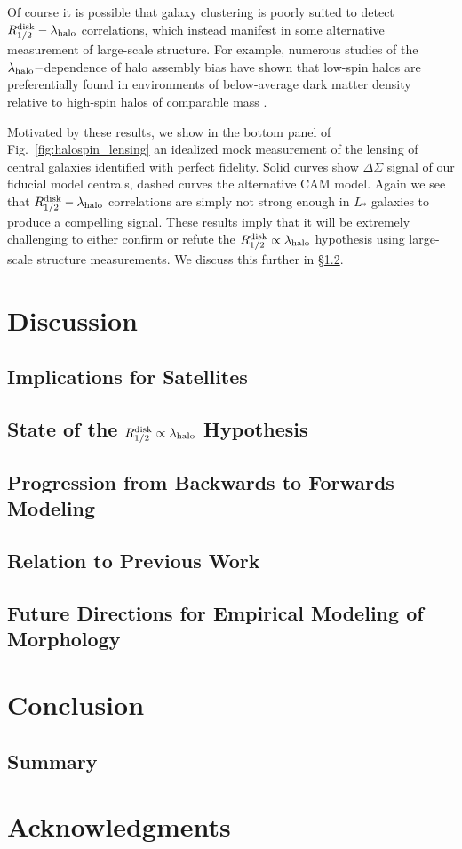 \documentclass[usenatbib,usegraphicx,letterpaper]{mn2e}
\newcommand{\rhalfdisk}{R_{1/2}^{\rm disk}}
\newcommand{\halospin}{\lambda_{\rm halo}}
\begin{document}
Of course it is possible that galaxy clustering is poorly suited to detect $\rhalfdisk-\halospin$ correlations, which instead manifest in some alternative measurement of large-scale structure. For example, numerous studies of the $\halospin-$dependence of halo assembly bias have shown that low-spin halos are preferentially found in environments of below-average dark matter density relative to high-spin halos of comparable mass \citep[see, for example,][]{lee_etal17}.

Motivated by these results, we show in the bottom panel of Fig.~\ref{fig:halospin_lensing} an idealized mock measurement of the lensing of central galaxies identified with perfect fidelity. Solid curves show $\Delta\Sigma$ signal of our fiducial model centrals, dashed curves the alternative CAM model. Again we see that $\rhalfdisk-\halospin$ correlations are simply not strong enough in $L_\ast$ galaxies to produce a compelling signal. These results imply that it will be extremely challenging to either confirm or refute the $\rhalfdisk\propto\halospin$ hypothesis using large-scale structure measurements. We discuss this further in \S\ref{subsec:mo_status}.


\section{Discussion}
\label{sec:discussion}


\subsection{Implications for Satellites}
\label{subsec:satellite_discussion}

\subsection{State of the $\rhalfdisk\propto\halospin$ Hypothesis}
\label{subsec:mo_status}

\subsection{Progression from Backwards to Forwards Modeling}
\label{subsec:forwardsmodeling}

\subsection{Relation to Previous Work}
\label{subsec:previouswork}

\subsection{Future Directions for Empirical Modeling of Morphology}
\label{subsec:future}


\section{Conclusion}
\label{sec:conclusion}

\subsection{Summary}
\label{subsec:summary}

\section*{Acknowledgments}


\end{document}

